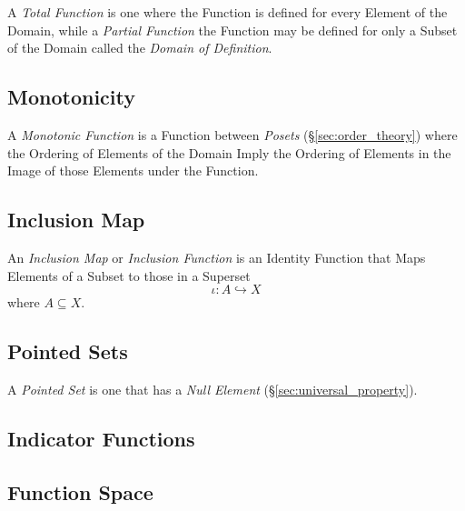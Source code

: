 \documentclass{article}
\begin{document}
A \emph{Total Function} is one where the Function is defined for every
Element of the Domain, while a \emph{Partial Function} the Function
may be defined for only a Subset of the Domain called the \emph{Domain
  of Definition}.

\subsection{Monotonicity}\label{subsec:monotonicity}

A \emph{Monotonic Function} is a Function between \emph{Posets}
(\S\ref{sec:order_theory}) where the Ordering of Elements of the
Domain Imply the Ordering of Elements in the Image of those Elements
under the Function.

\subsection{Inclusion Map}\label{subsec:inclusion_map}

An \emph{Inclusion Map} or \emph{Inclusion Function} is an Identity
Function that Maps Elements of a Subset to those in a Superset
\[
    \iota : A \hookrightarrow X
\]
where $A \subseteq X$.

\subsection{Pointed Sets}

A \emph{Pointed Set} is one that has a \emph{Null Element}
(\S\ref{sec:universal_property}).

\subsection{Indicator Functions}\label{subsec:indicator_function}

\subsection{Function Space}\label{subsec:function_space}
\end{document}

